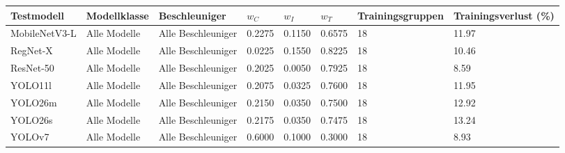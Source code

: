 \begin{tabular}{@{}llllllll@{}}
\toprule
Testmodell & Modellklasse & Beschleuniger & $w_C$ & $w_I$ & $w_T$ & Trainingsgruppen & Trainingsverlust (\%) \\
\midrule
MobileNetV3-L & Alle Modelle & Alle Beschleuniger & 0.2275 & 0.1150 & 0.6575 & 18 & 11.97 \\
RegNet-X & Alle Modelle & Alle Beschleuniger & 0.0225 & 0.1550 & 0.8225 & 18 & 10.46 \\
ResNet-50 & Alle Modelle & Alle Beschleuniger & 0.2025 & 0.0050 & 0.7925 & 18 & 8.59 \\
YOLO11l & Alle Modelle & Alle Beschleuniger & 0.2075 & 0.0325 & 0.7600 & 18 & 11.95 \\
YOLO26m & Alle Modelle & Alle Beschleuniger & 0.2150 & 0.0350 & 0.7500 & 18 & 12.92 \\
YOLO26s & Alle Modelle & Alle Beschleuniger & 0.2175 & 0.0350 & 0.7475 & 18 & 13.24 \\
YOLOv7 & Alle Modelle & Alle Beschleuniger & 0.6000 & 0.1000 & 0.3000 & 18 & 8.93 \\
\bottomrule
\end{tabular}
